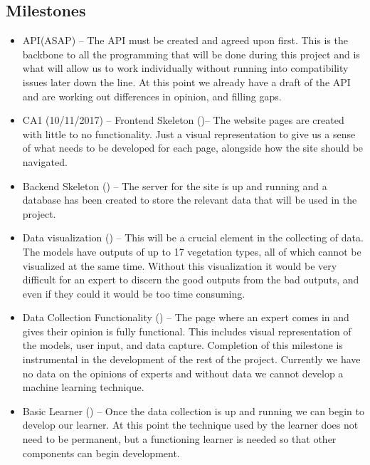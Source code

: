 \documentclass{ecmm427_assignment}
\begin{document}
\subsection{Milestones}

\begin{itemize}

\item API(ASAP) – The API must be created and agreed upon first. This is the backbone to all the programming that will be done during this project and is what will allow us to work individually without running into compatibility issues later down the line. At this point we already have a draft of the API and are working out differences in opinion, and filling gaps.

\item CA1 (10/11/2017) – 
Frontend Skeleton ()– The website pages are created with little to no functionality. Just a visual representation to give us a sense of what needs to be developed for each page, alongside how the site should be navigated.

\item Backend Skeleton () –  The server for the site is up and running and a database has been created to store the relevant data that will be used in the project. 

\item Data visualization () –  This will be a crucial element in the collecting of data. The models have outputs of up to 17 vegetation types, all of which cannot be visualized at the same time. Without this visualization it would be very difficult for an expert to discern the good outputs from the bad outputs, and even if they could it would be too time consuming.

\item Data Collection Functionality () – The page where an expert comes in and gives their opinion is fully functional. This includes visual representation of the models, user input, and data capture. Completion of this milestone is instrumental in the development of the rest of the project. Currently we have no data on the opinions of experts and without data we cannot develop a machine learning technique.

\item Basic Learner () – Once the data collection is up and running we can begin to develop our learner. At this point the technique used by the learner does not need to be permanent, but a functioning learner is needed so that other components can begin development.


\end{itemize}
\end{document}

